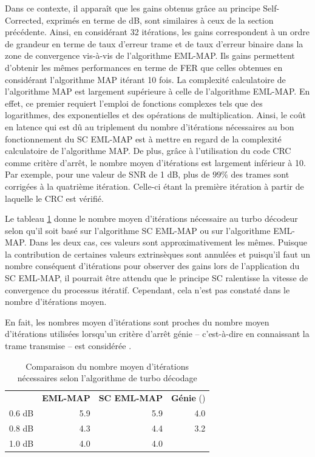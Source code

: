 Dans ce contexte, il apparaît que les gains obtenus grâce au principe Self-Corrected, exprimés en terme de dB, sont similaires à ceux de la 
section précédente. Ainsi, en considérant 32 itérations, les gains correspondent à un ordre de grandeur en 
terme de taux d'erreur trame et de taux d'erreur binaire dans la zone de convergence vis-à-vis de l'algorithme EML-MAP. 
Ils gains permettent d'obtenir les mêmes performances en terme de FER que celles obtenues en considérant l'algorithme 
MAP itérant 10 fois. La complexité calculatoire de l’algorithme MAP 
est largement supérieure à celle de l'algorithme EML-MAP. En effet, ce premier requiert l’emploi de fonctions complexes 
tels que des logarithmes, des exponentielles et des opérations de multiplication. Ainsi, le coût en latence qui est dû 
au triplement du nombre d'itérations nécessaires au bon fonctionnement du SC 
EML-MAP est à mettre en regard de la complexité calculatoire de l'algorithme MAP. 
De plus, grâce à l'utilisation du code CRC comme critère d'arrêt, le nombre moyen d'itérations est largement inférieur à 10. 
Par exemple, pour une valeur de SNR de 1 dB, plus de $99\%$ des trames sont corrigées à la quatrième itération. Celle-ci étant la première 
itération à partir de laquelle le CRC est vérifié. 

Le tableau \ref{tab:itmoy} donne le nombre moyen d'itérations nécessaire au turbo décodeur selon qu'il soit basé sur 
l'algorithme SC EML-MAP ou sur l'algorithme EML-MAP. Dans les deux cas, ces valeurs sont approximativement les mêmes. 
Puisque la contribution de certaines valeurs extrinsèques sont annulées et puisqu'il faut un nombre conséquent d'itérations 
pour observer des gains lors de l'application du SC EML-MAP, il pourrait être attendu que le principe SC ralentisse la vitesse 
de convergence du processus itératif. Cependant, cela n'est pas constaté dans le nombre d'itérations moyen.

En fait, les nombres moyen d'itérations sont proches du nombre moyen d'itérations utilisées lorsqu'un critère d'arrêt 
génie -- c'est-à-dire en connaissant la trame transmise -- est considérée \cite{matache2000stopping}.
\begin{table}[!h]
	\centering
	\renewcommand{\arraystretch}{.9}
	\begin{tabular}{lrrr}
		\toprule
		    & \textbf{EML-MAP} & \textbf{SC EML-MAP} & \textbf{Génie} (\cite{matache2000stopping})\\ 
		 \cmidrule(l){2-2} \cmidrule(l){3-3} \cmidrule(l){4-4} 
		0.6 dB & 5.9 &  5.9 & 4.0\\
		0.8 dB & 4.3 & 4.4 & 3.2\\
		1.0 dB & 4.0 & 4.0 & \\
		\bottomrule
	\end{tabular}
	\caption{Comparaison du nombre moyen d’itérations nécessaires selon l'algorithme de turbo décodage}
	\label{tab:itmoy}
\end{table}

